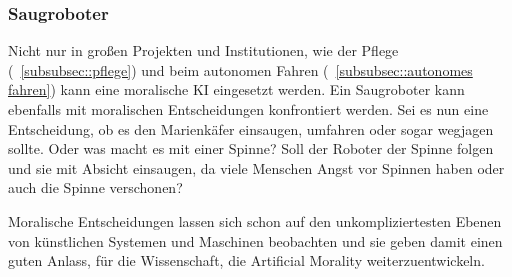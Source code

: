 \subsubsection{Saugroboter}\label{subsubsec::saugroboter}

Nicht nur in großen Projekten und Institutionen, wie der Pflege (~\ref{subsubsec::pflege}) und beim autonomen Fahren (~\ref{subsubsec::autonomes fahren})
kann eine moralische KI eingesetzt werden.
Ein Saugroboter kann ebenfalls mit moralischen Entscheidungen konfrontiert werden.
Sei es nun eine Entscheidung, ob es den Marienkäfer einsaugen, umfahren oder sogar wegjagen sollte.
Oder was macht es mit einer Spinne?
Soll der Roboter der Spinne folgen und sie mit Absicht einsaugen, da viele Menschen Angst vor Spinnen haben oder auch
die Spinne verschonen?

Moralische Entscheidungen lassen sich schon auf den unkompliziertesten Ebenen von künstlichen Systemen und Maschinen beobachten
und sie geben damit einen guten Anlass, für die Wissenschaft, die Artificial Morality weiterzuentwickeln.

